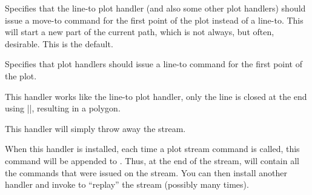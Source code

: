 \begin{command}{\pgfsetmovetofirstplotpoint}
    Specifies that the line-to plot handler (and also some other plot handlers)
    should issue a move-to command for the first point of the plot instead of a
    line-to. This will start a new part of the current path, which is not
    always, but often, desirable. This is the default.
\end{command}

\begin{command}{\pgfsetlinetofirstplotpoint}
    Specifies that  plot handlers should issue a line-to command for the first
    point of the plot.
\begin{codeexample}[]
\begin{pgfpicture}
  \pgfpathmoveto{\pgfpointorigin}
  \pgfsetlinetofirstplotpoint
  \pgfplothandlerlineto
  \pgfplotstreamstart
  \pgfplotstreampoint{\pgfpoint{1cm}{0cm}}
  \pgfplotstreampoint{\pgfpoint{2cm}{1cm}}
  \pgfplotstreampoint{\pgfpoint{3cm}{2cm}}
  \pgfplotstreampoint{\pgfpoint{1cm}{2cm}}
  \pgfplotstreamend
\end{pgfpicture}
\end{codeexample}
\end{command}

\begin{command}{\pgfplothandlerpolygon}
    This handler works like the line-to plot handler, only the line is closed
    at the end using |\pgfpathclose|, resulting in a polygon.
\end{command}

\begin{command}{\pgfplothandlerdiscard}
    This handler will simply throw away the stream.
\end{command}

\begin{command}{\pgfplothandlerrecord{}}
    When this handler is installed, each time a plot stream command is called,
    this command will be appended to . Thus, at the end of the
    stream,  will contain all the commands that were issued on the
    stream. You can then install another handler and invoke  to
    ``replay'' the stream (possibly many times).
\begin{codeexample}[]
\begin{pgfpicture}
  \pgfplothandlerrecord{\mystream}
  \pgfplotstreamstart
  \pgfplotstreampoint{\pgfpoint{1cm}{0cm}}
  \pgfplotstreampoint{\pgfpoint{2cm}{1cm}}
  \pgfplotstreampoint{\pgfpoint{3cm}{1cm}}
  \pgfplotstreampoint{\pgfpoint{1cm}{2cm}}
  \pgfplotstreamend
  \pgfplothandlerlineto
  \mystream
  \pgfplothandlerclosedcurve
  \mystream
\end{pgfpicture}
\end{codeexample}
\end{command}


